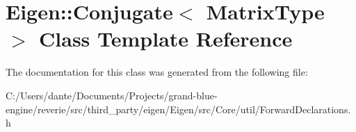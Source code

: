 \hypertarget{class_eigen_1_1_conjugate}{}\section{Eigen\+::Conjugate$<$ Matrix\+Type $>$ Class Template Reference}
\label{class_eigen_1_1_conjugate}


The documentation for this class was generated from the following file\+:\begin{DoxyCompactItemize}
\item 
C\+:/\+Users/dante/\+Documents/\+Projects/grand-\/blue-\/engine/reverie/src/third\+\_\+party/eigen/\+Eigen/src/\+Core/util/Forward\+Declarations.\+h\end{DoxyCompactItemize}
